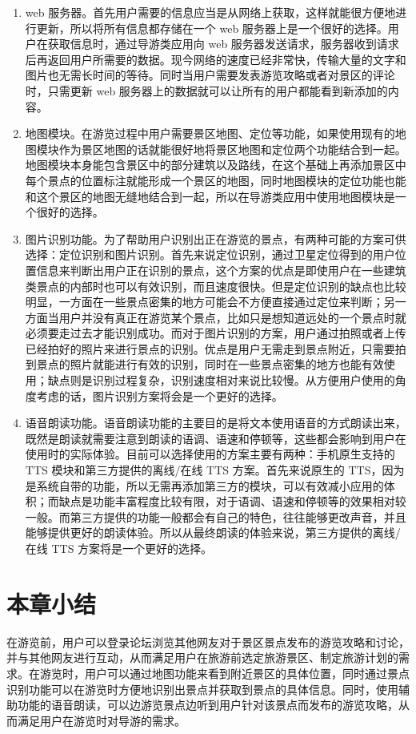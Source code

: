 			\begin{enumerate}
				
				\item web 服务器。首先用户需要的信息应当是从网络上获取，这样就能很方便地进行更新，所以将所有信息都存储在一个 web 服务器上是一个很好的选择。用户在获取信息时，通过导游类应用向 web 服务器发送请求，服务器收到请求后再返回用户所需要的数据。现今网络的速度已经非常快，传输大量的文字和图片也无需长时间的等待。同时当用户需要发表游览攻略或者对景区的评论时，只需更新 web 服务器上的数据就可以让所有的用户都能看到新添加的内容。

				\item 地图模块。在游览过程中用户需要景区地图、定位等功能，如果使用现有的地图模块作为景区地图的话就能很好地将景区地图和定位两个功能结合到一起。地图模块本身能包含景区中的部分建筑以及路线，在这个基础上再添加景区中每个景点的位置标注就能形成一个景区的地图，同时地图模块的定位功能也能和这个景区的地图无缝地结合到一起，所以在导游类应用中使用地图模块是一个很好的选择。

				\item 图片识别功能。为了帮助用户识别出正在游览的景点，有两种可能的方案可供选择：定位识别和图片识别。首先来说定位识别，通过卫星定位得到的用户位置信息来判断出用户正在识别的景点，这个方案的优点是即使用户在一些建筑类景点的内部时也可以有效识别，而且速度很快。但是定位识别的缺点也比较明显，一方面在一些景点密集的地方可能会不方便直接通过定位来判断；另一方面当用户并没有真正在游览某个景点，比如只是想知道远处的一个景点时就必须要走过去才能识别成功。而对于图片识别的方案，用户通过拍照或者上传已经拍好的照片来进行景点的识别。优点是用户无需走到景点附近，只需要拍到景点的照片就能进行有效的识别，同时在一些景点密集的地方也能有效使用；缺点则是识别过程复杂，识别速度相对来说比较慢。从方便用户使用的角度考虑的话，图片识别方案将会是一个更好的选择。

				\item 语音朗读功能。语音朗读功能的主要目的是将文本使用语音的方式朗读出来，既然是朗读就需要注意到朗读的语调、语速和停顿等，这些都会影响到用户在使用时的实际体验。目前可以选择使用的方案主要有两种：手机原生支持的 TTS 模块和第三方提供的离线/在线 TTS 方案。首先来说原生的 TTS，因为是系统自带的功能，所以无需再添加第三方的模块，可以有效减小应用的体积；而缺点是功能丰富程度比较有限，对于语调、语速和停顿等的效果相对较一般。而第三方提供的功能一般都会有自己的特色，往往能够更改声音，并且能够提供更好的朗读体验。所以从最终朗读的体验来说，第三方提供的离线/在线 TTS 方案将是一个更好的选择。

			\end{enumerate}
		
	\section{本章小结}
	
		在游览前，用户可以登录论坛浏览其他网友对于景区景点发布的游览攻略和讨论，并与其他网友进行互动，从而满足用户在旅游前选定旅游景区、制定旅游计划的需求。在游览时，用户可以通过地图功能来看到附近景区的具体位置，同时通过景点识别功能可以在游览时方便地识别出景点并获取到景点的具体信息。同时，使用辅助功能的语音朗读，可以边游览景点边听到用户针对该景点而发布的游览攻略，从而满足用户在游览时对导游的需求。


		